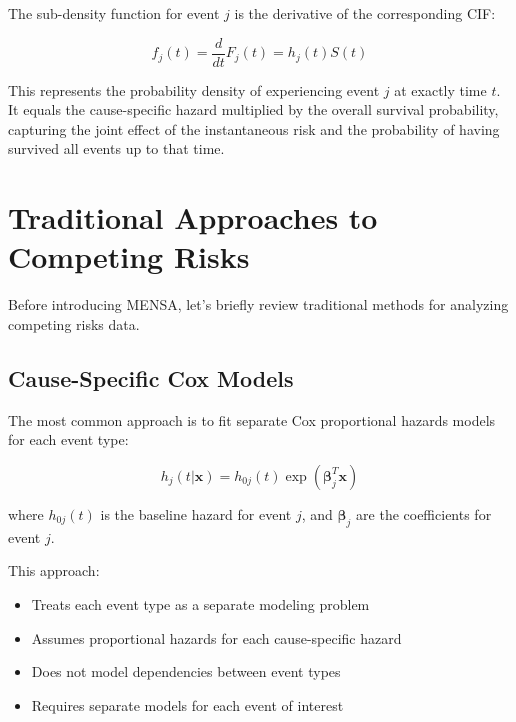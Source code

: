 The sub-density function for event $j$ is the derivative of the corresponding CIF:

\begin{equationbox}[title=Sub-Density Function]
\begin{equation}
f_j(t) = \frac{d}{dt}F_j(t) = h_j(t) S(t)
\end{equation}
\end{equationbox}

This represents the probability density of experiencing event $j$ at exactly time $t$. It equals the cause-specific hazard multiplied by the overall survival probability, capturing the joint effect of the instantaneous risk and the probability of having survived all events up to that time.

\section{Traditional Approaches to Competing Risks}

Before introducing MENSA, let's briefly review traditional methods for analyzing competing risks data.

\subsection{Cause-Specific Cox Models}

The most common approach is to fit separate Cox proportional hazards models for each event type:

\begin{equationbox}[title=Cause-Specific Cox Model]
\begin{equation}
h_j(t|\mathbf{x}) = h_{0j}(t) \exp(\boldsymbol{\beta}_j^T \mathbf{x})
\end{equation}

where $h_{0j}(t)$ is the baseline hazard for event $j$, and $\boldsymbol{\beta}_j$ are the coefficients for event $j$.
\end{equationbox}

This approach:
\begin{itemize}
    \item Treats each event type as a separate modeling problem
    \item Assumes proportional hazards for each cause-specific hazard
    \item Does not model dependencies between event types
    \item Requires separate models for each event of interest
\end{itemize}

